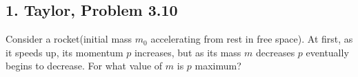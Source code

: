 \documentclass[a4paper,12pt]{article}
\begin{document}
\subsection*{1. Taylor, Problem 3.10}
Consider a rocket(initial mass $m_0$ accelerating from rest in free space).  At first, as it speeds up, its momentum $p$ increases, but as its mass $m$ decreases $p$ eventually begins to decrease.  For what value of $m$ is $p$ maximum?
\end{document}
